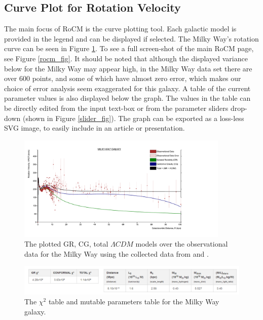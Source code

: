 \documentclass[conference]{IEEEtran-modified}
\begin{document}
\subsection{Curve Plot for Rotation Velocity}
The main focus of RoCM is the curve plotting tool. Each galactic model is provided in the legend and can be displayed if selected. The Milky Way's rotation curve can be seen in Figure \ref{milkywayplot}. To see a full screen-shot of the main RoCM page, see Figure \ref{rocm_fig}. It should be noted that although the displayed variance below for the Milky Way may appear high, in the Milky Way data set \cite{kundu} there are over 600 points, and some of which have almost zero error, which makes our choice of error analysis seem exaggerated for this galaxy. A table of the current parameter values is also displayed below the graph. The values in the table can be directly edited from the input text-box or from the parameter sliders drop-down (shown in Figure \ref{slider_fig}). The graph can be exported as a loss-less SVG image, to easily include in an article or presentation.

\begin{figure}[h!]
\centering
\includegraphics[width=0.9\textwidth]{MILKY-WAY}
\caption{The plotted GR, CG, total $\Lambda CDM$ models over the observational data for the Milky Way using the collected data from \cite{kundu} and \cite{sofue}.}
\label{milkywayplot}
\end{figure}

\begin{figure}[h!]
\centering
\includegraphics[width=\textwidth]{MILKY-WAY-CHI-PARAMS}
\caption{The $\chi^2$ table and mutable parameters table for the Milky Way galaxy.}
\label{param_table_fig}
\end{figure}
\end{document}
